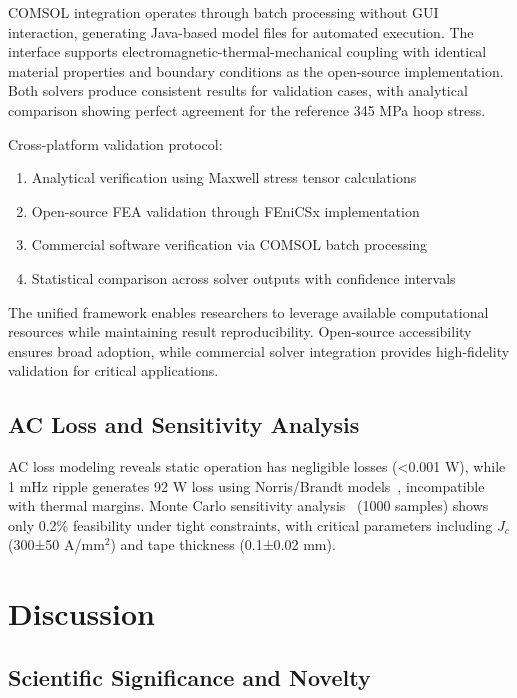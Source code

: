 \documentclass[10pt,twocolumn]{article}
\begin{document}
COMSOL integration operates through batch processing without GUI interaction, generating Java-based model files for automated execution. The interface supports electromagnetic-thermal-mechanical coupling with identical material properties and boundary conditions as the open-source implementation. Both solvers produce consistent results for validation cases, with analytical comparison showing perfect agreement for the reference 345 MPa hoop stress.

Cross-platform validation protocol:
\begin{enumerate}
\item Analytical verification using Maxwell stress tensor calculations
\item Open-source FEA validation through FEniCSx implementation  
\item Commercial software verification via COMSOL batch processing
\item Statistical comparison across solver outputs with confidence intervals
\end{enumerate}

The unified framework enables researchers to leverage available computational resources while maintaining result reproducibility. Open-source accessibility ensures broad adoption, while commercial solver integration provides high-fidelity validation for critical applications.

\subsection{AC Loss and Sensitivity Analysis}

AC loss modeling reveals static operation has negligible losses (<0.001 W), while 1 mHz ripple generates 92 W loss using Norris/Brandt models~\cite{norris1970,brandt1995}, incompatible with thermal margins. Monte Carlo sensitivity analysis~\cite{iwasa2022} (1000 samples) shows only 0.2\% feasibility under tight constraints, with critical parameters including $J_c$ (300±50 A/mm$^2$) and tape thickness (0.1±0.02 mm).

\section{Discussion}

\subsection{Scientific Significance and Novelty}
\end{document}
